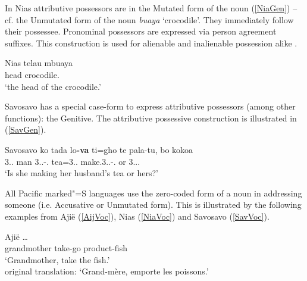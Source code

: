 In Nias attributive possessors are in the Mutated form of the noun (\ref{NiaGen}) -- cf. the Unmutated form of the noun \emph{buaya} `crocodile'. %
They immediately follow their possessee. Pronominal possessors are expressed via person agreement suffixes. 
This construction is used for alienable and inalienable possession alike \citep[374]{Brown:2001}.

\begin{exe}
\ex\label{NiaGen} {Nias} \citep[Sundic; Indonesia; ][374]{Brown:2001}\nopagebreak[4]
\gll telau mbuaya\\
head crocodile.\mut{}\\
`the head of the crocodile.'
\end{exe}

Savosavo has a special case-form to express attributive possessors (among other functions): the Genitive.
The attributive possessive construction is illustrated in (\ref{SavGen}).
\enlargethispage{\baselineskip}
\begin{exe}\ex\label{SavGen} {Savosavo} \citep[Solomons East Papuan; Solomon Islands; ][132]{Wegener:2008}\nopagebreak[4]
\gll ko tada lo\textbf{-va} ti=gho te pala-tu, bo kokoa\\
3\sg{}.\fem{}.\gen{} man 3.\sg{}.\mas{}-\gen{}.\mas{} tea=3\sg{}.\fem{}.\nom{} \emphat{} make.3\sg{}.\mas.\obj-\prs.\ipfv{} or 3\sg{}.\fem{}.\poss{}.\mas{}\\
`Is she making her husband's tea or hers?'
\end{exe}

All Pacific marked"=S languages use the zero-coded form of a noun in addressing someone (i.e. Accusative or Unmutated form).
This is illustrated by the following examples from Aji\"e (\ref{AijVoc}), Nias (\ref{NiaVoc}) and Savosavo (\ref{SavVoc}).

\pagebreak
\begin{exe}\ex\label{AijVoc} {Aji\"e} \citep[199]{Fontinelle:1961}\nopagebreak[4]
\gll\textbf{}    \dots\\
grandmother take-go \pl{} product-fish\\
`Grandmother, take the fish.'\\
original translation: `Grand-m\`ere, emporte les poissons.'
\end{exe}

